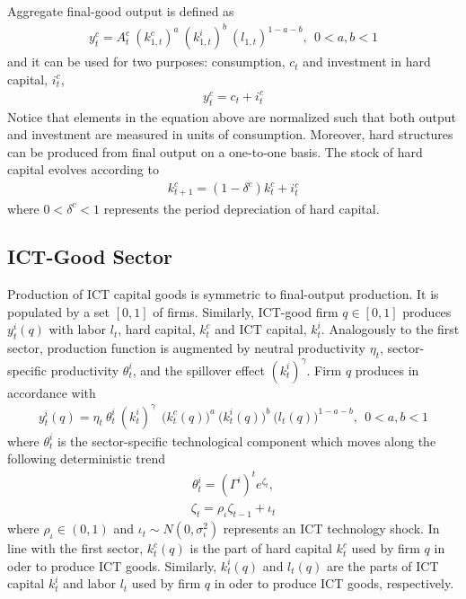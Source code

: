 \documentclass[12pt]{article}
\begin{document}
Aggregate final-good output is defined as
\begin{eqnarray}\label{equation:production_FINAL_aggregate}
y^c_t = A^c_t \ ( k^c_{1,t} )^a \ ( k^i_{1,t} )^b \ ( l_{1,t} )^{1-a-b}, \ \ 0 < a,b < 1
\end{eqnarray}
and it can be used for two purposes: consumption, $c_t$ and investment in hard capital, $i^c_t$,
\begin{eqnarray}\label{equation:resourceFINAL}
y^c_t = c_t + i^c_t
\end{eqnarray}
Notice that elements in the equation above are normalized such that both output and investment are measured in units of consumption. Moreover, hard structures can be produced from final output on a one-to-one basis. The stock of hard capital evolves according to
\begin{eqnarray}\label{equation:LOM_Hard}
k^c_{t+1} = (1 - \delta^c) k^c_t + i^c_t
\end{eqnarray}
where $0 < \delta^c < 1$ represents the period depreciation of hard capital.

\subsection{ICT-Good Sector}

Production of ICT capital goods is symmetric to final-output production. It is populated by a set $[0,1]$ of firms. Similarly, ICT-good firm $q \in [0,1]$ produces $y^i_t(q)$ with labor $l_{t}$, hard capital, $k^c_{t}$ and ICT capital, $k^i_{t}$. Analogously to the first sector, production function is augmented by neutral productivity $\eta_t$, sector-specific productivity $\theta^i_t$, and the spillover effect $(k^i_{t})^{\gamma}$. Firm $q$ produces in accordance with
\begin{eqnarray}\label{equation:productionICT}
y^i_t(q) = \eta_t \ \theta^i_t \ (k^i_{t})^{\gamma} \ \ \big( k^c_{t}(q) \big)^a \ \big( k^i_{t}(q) \big)^b \ \big( l_{t}(q) \big)^{1-a-b}, \ \ 0 < a,b < 1
\end{eqnarray}
where $\theta^i_t$ is the sector-specific technological component which moves along the following deterministic trend
\begin{eqnarray}\label{equation:ICT_tech_process}
\theta^i_t = (\Gamma^{i})^t e^{\zeta_t},  
\end{eqnarray} 
\begin{eqnarray}\label{equation:ICT_tech_shock}
\zeta_t = \rho_{\iota} \zeta_{t-1} + \iota_t
\end{eqnarray} 
where $\rho_{\iota} \in (0,1)$ and $\iota_t \sim N(0,\sigma_{\iota}^2)$ represents an ICT technology shock. In line with the first sector, $k^c_{t}(q)$ is the part of hard capital $k^c_t$ used by firm $q$ in oder to produce ICT goods. Similarly, $k^i_{t}(q)$ and $l_{t}(q)$ are the parts of ICT capital $k^i_t$ and labor $l_t$ used by firm $q$ in oder to produce ICT goods, respectively. 
\end{document}
